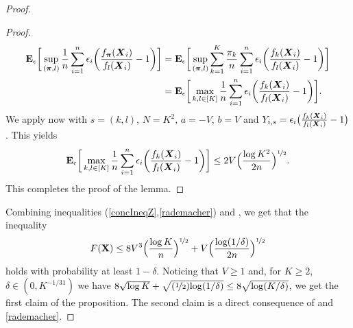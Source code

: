 \begin{proof}
\begin{proof}
\begin{align}
		\mathbf E_{\epsilon}\bigg[ \sup_{(\boldsymbol \pi,l)}\frac{1}{n}\sum_{i=1}^n \epsilon_i \bigg(\frac{f_{\boldsymbol \pi}(\boldsymbol X_i)}{f_l(\boldsymbol X_i)}
		-1\bigg) \bigg]
		&= \mathbf E_{\epsilon}\bigg[ \sup_{(\boldsymbol \pi,l)} \sum_{k=1}^K \frac{\pi_k}{n}\sum_{i=1}^n \epsilon_i
		\bigg(\frac{f_{k}(\boldsymbol X_i)}{f_l(\boldsymbol X_i)} -1\bigg)  \bigg]\nonumber\\
		&=\mathbf E_{\epsilon}\bigg[ \max_{k,l\in[K]} \frac{1}{n}\sum_{i=1}^n \epsilon_i
		\bigg(\frac{f_{k}(\boldsymbol X_i)}{f_l(\boldsymbol X_i)} -1\bigg) \bigg].
		\end{align}
		We apply now  with $s= (k,l)$, $N = K^2$, $a=-V$, $b= V$ and $Y_{i,s} = \epsilon_i
		\big(\frac{f_{k}(\boldsymbol X_i)}{f_l(\boldsymbol X_i)} -1\big)$. This yields
		\begin{align}
		\mathbf E_{\epsilon}\bigg[ \max_{k,l\in[K]}  \frac{1}{n}\sum_{i=1}^n \epsilon_i
		\bigg(\frac{f_{k}(\boldsymbol X_i)}{f_l(\boldsymbol X_i)} -1\bigg) \bigg]
		\le 2V \Big(\frac{\log K^2}{2n}\Big)^{\nicefrac12}.
		\end{align}
		This completes the proof of the lemma.
	\end{proof}
	Combining inequalities (\ref{concIneqZ},\ref{rademacher}) and , we get that the inequality
	\begin{equation}
	F(\mathbf X) \le 8V^3\Big(\frac{\log K}{n}\Big)^{\nicefrac12}+ V\Big(\frac{\log(1/\delta)}{2n}\Big)^{\nicefrac12}
	\end{equation}
	holds with probability at least $1-\delta$. Noticing that $V\ge 1$ and, for $K\ge 2$, $\delta\in(0,K^{-1/31})$
	we have $8\sqrt{\log K}+ \sqrt{(\nicefrac12){\log(1/\delta)}}\le 8\sqrt{\log(K/\delta)}$,
	we get the first claim of the proposition. The second claim is a direct consequence
	of  and \eqref{rademacher}.
\end{proof}


